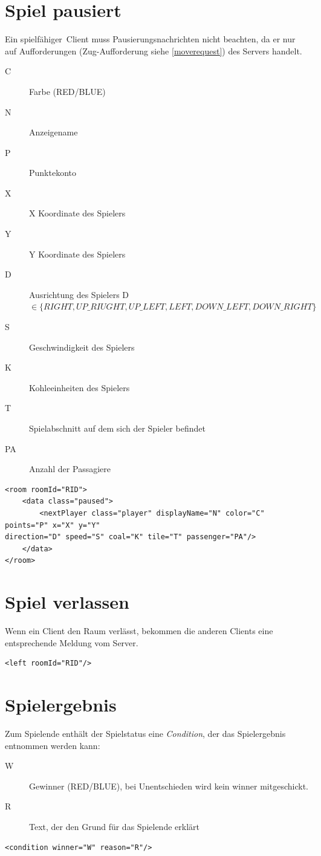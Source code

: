 \documentclass[12pt,a4paper, ngerman, oneside]{scrartcl}
\begin{document}
\section{Spiel pausiert}
Ein \glqq spielfähiger\grqq\ Client muss Pausierungsnachrichten nicht beachten,
da er nur auf Aufforderungen (Zug-Aufforderung siehe \ref{moverequest}) des Servers handelt.
\begin{description}
\item[C] Farbe (RED/BLUE)
\item[N] Anzeigename
\item[P] Punktekonto
\item[X] X Koordinate des Spielers
\item[Y] Y Koordinate des Spielers
\item[D] Ausrichtung des Spielers  D $\in \{RIGHT, UP\_RIUGHT, UP\_LEFT, LEFT, DOWN\_LEFT, DOWN\_RIGHT\}$
\item[S] Geschwindigkeit des Spielers
\item[K] Kohleeinheiten des Spielers
\item[T] Spielabschnitt auf dem sich der Spieler befindet
\item[PA] Anzahl der Passagiere
\end{description}
\begin{verbatim}
<room roomId="RID">
	<data class="paused">
		<nextPlayer class="player" displayName="N" color="C" points="P" x="X" y="Y"
direction="D" speed="S" coal="K" tile="T" passenger="PA"/>
	</data>
</room>
\end{verbatim}

\section{Spiel verlassen}
Wenn ein Client den Raum verlässt, bekommen die anderen Clients eine entsprechende Meldung vom Server.
\begin{verbatim}
<left roomId="RID"/>
\end{verbatim}


\section{\label{gameend}Spielergebnis}
Zum Spielende enthält der Spielstatus eine \textit{Condition}, der das Spielergebnis entnommen werden kann:
\begin{description}
\item[W] Gewinner (RED/BLUE), bei Unentschieden wird kein winner mitgeschickt.
\item[R] Text, der den Grund für das Spielende erklärt
\end{description}
\begin{verbatim}
<condition winner="W" reason="R"/>
\end{verbatim}
\end{document}
